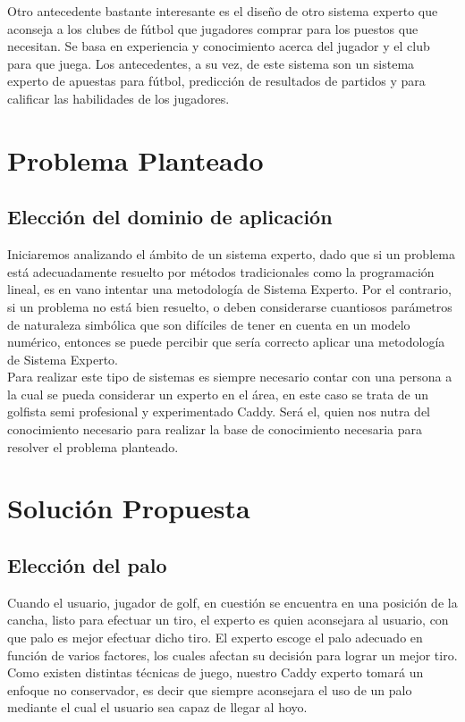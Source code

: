 \documentclass[runningheads,a4paper]{llncs}
\begin{document}
  Otro antecedente bastante interesante es el diseño de otro sistema experto que
  aconseja a los clubes de fútbol que jugadores comprar para los puestos que
  necesitan. Se basa en experiencia y conocimiento acerca del jugador y el club
  para que juega.\cite{EC4} Los antecedentes, a su vez, de este sistema son un
  sistema experto de apuestas para fútbol\cite{EC5}, predicción de resultados de
  partidos\cite{EC6} y para calificar las habilidades de los jugadores\cite{EC7}.



\section{Problema Planteado}

\subsection{Elección del dominio de aplicación}

  Iniciaremos analizando el ámbito de un sistema experto, dado que si un problema
  está adecuadamente resuelto por métodos tradicionales como la programación
  lineal, es en vano intentar una metodología de Sistema Experto. Por el
  contrario, si un problema no está bien resuelto, o deben considerarse
  cuantiosos parámetros de naturaleza simbólica que son difíciles de tener en
  cuenta en un modelo numérico, entonces se puede percibir que sería correcto
  aplicar una metodología de Sistema Experto.\\ Para realizar este tipo de
  sistemas es siempre necesario contar con una persona a la cual se pueda
  considerar un experto en el área, en este caso se trata de un golfista semi
  profesional y experimentado Caddy. Será el, quien nos nutra del conocimiento
  necesario para realizar la base de conocimiento necesaria para resolver el
  problema planteado.\\

\section{Solución Propuesta}

\subsection{Elección del palo}

  Cuando el usuario, jugador de golf, en cuestión se encuentra en una posición de
  la cancha, listo para efectuar un tiro, el experto es quien aconsejara al
  usuario, con que palo es mejor efectuar dicho tiro. El experto escoge el palo
  adecuado en función de varios factores, los cuales afectan su decisión para
  lograr un mejor tiro.\\ Como existen distintas técnicas de juego, nuestro Caddy
  experto tomará un enfoque no conservador, es decir que siempre aconsejara el
  uso de un palo mediante el cual el usuario sea capaz de llegar al hoyo.
	
\end{document}
